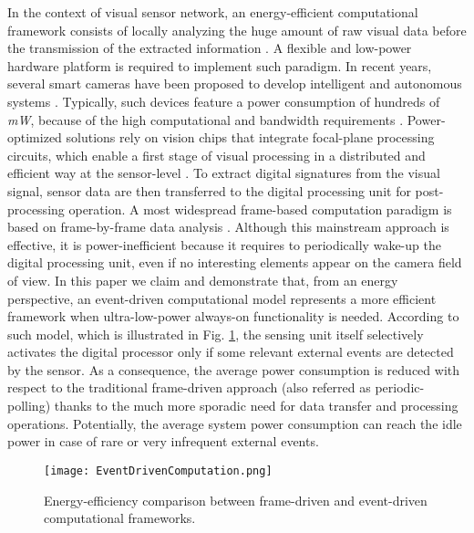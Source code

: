 \documentclass[journal]{IEEEtran}
\begin{document}
In the context of visual sensor network, 
an energy-efficient computational framework consists of locally analyzing the huge amount of raw visual data before the transmission of the extracted information \cite{Bondi2015}. A flexible and low-power hardware platform is required to implement such paradigm. 
In recent years, several smart cameras have been proposed to develop intelligent and autonomous systems \cite{Tavli2012}. Typically, such devices feature a power consumption of hundreds of \textit{mW}, because of the high computational and bandwidth requirements \cite{Chen2013,CMUCAM,Bondi2015}. 
Power-optimized solutions rely on vision chips that integrate focal-plane processing circuits, which enable a first stage of visual processing in a distributed and efficient way at the sensor-level \cite{Fernandez2016}. 
To extract digital signatures from the visual signal, sensor data are then transferred to the digital processing unit for post-processing operation.
A most widespread frame-based computation paradigm is based on frame-by-frame data analysis \cite{Ko2007}.
Although this mainstream approach is effective, it is power-inefficient because it requires to periodically wake-up the digital processing unit, even if no interesting elements appear on the camera field of view. In this paper we claim and demonstrate that, from an energy perspective, an event-driven computational model represents a more efficient framework when ultra-low-power always-on functionality is needed. According to such model, which is illustrated in Fig. \ref{fig:EventDriven}, the sensing unit itself selectively activates the digital processor only if some relevant external events are detected by the sensor. 
As a consequence, the average power consumption is reduced with respect to the traditional frame-driven approach (also referred as periodic-polling) thanks to the much more sporadic need for data transfer and processing operations. Potentially, the average system power consumption can reach the idle power in case of rare or very infrequent external events.



\begin{figure}[]
	\centering
  	\texttt{[image: EventDrivenComputation.png]}
	\caption{Energy-efficiency comparison between frame-driven and event-driven computational frameworks.}
	\label{fig:EventDriven}       %
\end{figure}
\end{document}
